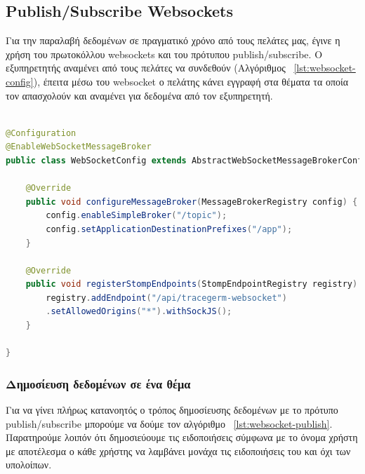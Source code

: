 \subsection{Publish/Subscribe Websockets}
 Για την παραλαβή δεδομένων σε πραγματικό χρόνο από τους πελάτες μας, έγινε η χρήση του πρωτοκόλλου websockets και του πρότυπου publish/subscribe. Ο εξυπηρετητής αναμένει από τους πελάτες να συνδεθούν (Αλγόριθμος ~\ref{lst:websocket-config}), έπειτα μέσω του websocket ο πελάτης κάνει εγγραφή στα θέματα τα οποία τον απασχολούν και αναμένει για δεδομένα από τον εξυπηρετητή. 
 
 \begin{lstlisting}[language=Java, caption=Βασική ρύθμιση websocket, label={lst:websocket-config}]

@Configuration
@EnableWebSocketMessageBroker
public class WebSocketConfig extends AbstractWebSocketMessageBrokerConfigurer {

    @Override
    public void configureMessageBroker(MessageBrokerRegistry config) {
        config.enableSimpleBroker("/topic");
        config.setApplicationDestinationPrefixes("/app");
    }

    @Override
    public void registerStompEndpoints(StompEndpointRegistry registry) {
        registry.addEndpoint("/api/tracegerm-websocket")
        .setAllowedOrigins("*").withSockJS();
    }

}
\end{lstlisting}

\subsubsection{Δημοσίευση δεδομένων σε ένα θέμα}
Για να γίνει πλήρως κατανοητός ο τρόπος δημοσίευσης δεδομένων με το πρότυπο publish/subscribe μπορούμε να δούμε τον αλγόριθμο  ~\ref{lst:websocket-publish}. Παρατηρούμε λοιπόν ότι δημοσιεύουμε τις ειδοποιήσεις σύμφωνα με το όνομα χρήστη με αποτέλεσμα ο κάθε χρήστης να λαμβάνει μονάχα τις ειδοποιήσεις του και όχι των υπολοίπων.

